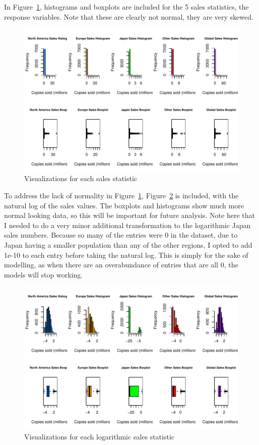 \documentclass[12pt]{article}
\begin{document}
In Figure~\ref{fig:histandboxsales}, histograms and boxplots are included for the 5 sales statistics, the response variables.
Note that these are clearly not normal, they are very skewed. 

\begin{figure}[tbp]
  \centering
  \includegraphics[width=\textwidth]{histandboxsales.pdf}
  \caption{Visualizations for each sales statistic}
  \label{fig:histandboxsales}
\end{figure}

To address the lack of normality in Figure~\ref{fig:histandboxsales}, Figure~\ref{fig:histandboxlogs} is included, with the natural log of the sales values.
The boxplots and histograms show much more normal looking data, so this will be important for future analysis. 
Note here that I needed to do a very minor additional transformation to the logarithmic Japan sales numbers. Because so many of the entries
were 0 in the dataset, due to Japan having a smaller population than any of the other regions, I opted to add 1e-10 to each entry before taking
the natural log. This is simply for the sake of modelling, as when there are an overabundance of entries that are all 0, the models will stop working.

\begin{figure}[tbp]
  \centering
  \includegraphics[width=\textwidth]{histandboxlogs.pdf}
  \caption{Visualizations for each logarithmic sales statistic}
  \label{fig:histandboxlogs}
\end{figure}
\end{document}
